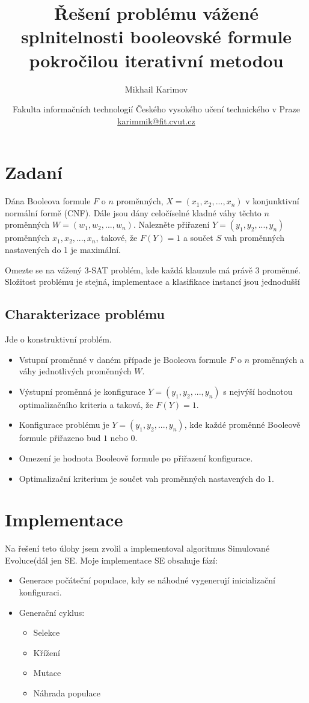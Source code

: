 \documentclass{article}
\title{Řešení problému vážené splnitelnosti booleovské formule pokročilou iterativní metodou} %
\author{\small Mikhail Karimov}
\date{\small Fakulta informačních technologií Českého vysokého učení technického v Praze\\ \url{karimmik@fit.cvut.cz}} %
\begin{document}
\maketitle


\section{Zadaní}

Dána Booleova formule \(F\) o \(n\) proměnných, \(X=(x_1, x_2, ... , x_n)\) v konjunktivní normální formě (CNF). Dále jsou dány celočíselné kladné váhy těchto \(n\) proměnných \(W=(w_1, w_2, ... , w_n)\). Nalezněte přiřazení \(Y=(y_1, y_2, ... , y_n)\) proměnných \(x_1, x_2, ... , x_n\), takové, že \(F(Y)=1\) a součet \(S\) vah proměnných nastavených do 1 je maximální. 

Omezte se na vážený 3-SAT problém, kde každá klauzule má právě 3 proměnné. Složitost problému je stejná, implementace a klasifikace instancí jsou jednodušší

\subsection{Charakterizace problému}

Jde o konstruktivní problém.

\begin{itemize}
\item Vstupní proměnné v daném případe je Booleova formule \(F\) o \(n\) proměnných a váhy jednotlivých proměnných \(W\).
\item Výstupní proměnná je konfigurace \(Y=(y_1, y_2, ..., y_n)\) s nejvýší hodnotou optimalizačního kriteria a taková, že \(F(Y)=1\).
\item Konfigurace problému je \(Y=(y_1, y_2, ..., y_n)\), kde každé proměnné Booleově formule přiřazeno bud \(1\) nebo \(0\).
\item Omezení je hodnota Booleově formule po přiřazení konfigurace.
\item Optimalizační kriterium je součet vah proměnných nastavených do 1.
\end{itemize}

\newpage
\section{Implementace}

Na řešení teto úlohy jsem zvolil a implementoval algoritmus Simulované Evoluce(dál jen SE. Moje implementace SE obsahuje fází:
\begin{itemize}
\item Generace počáteční populace, kdy se náhodné vygenerují inicializační konfiguraci.
\item Generační cyklus:
	\begin{itemize}
	\item Selekce
	\item Křížení
	\item Mutace
	\item Náhrada populace
	\end{itemize}
\end{itemize}
\end{document}

